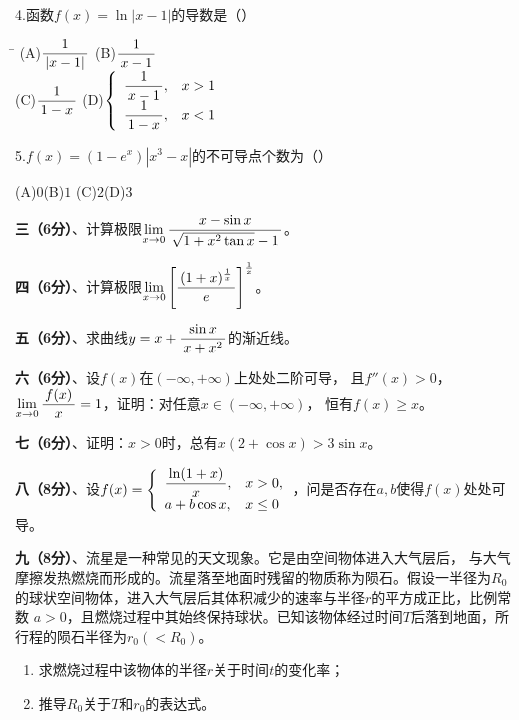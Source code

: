 4.\;函数$f(x)=\ln|x-1|$的导数是（\quad）%
\begin{tabbing}
	\hspace{8cm}\=\kill
	\quad\quad\quad(A)\;$\displaystyle\frac{\,{1}\,}{\,{|x-1|}\,}$ \> 
	(B)\;$\displaystyle\frac{\,{1}\,}{\,{x-1}\,}$ \\ 
	\quad\quad\quad(C)\;$\displaystyle\frac{\,{1}\,}{\,{1-x}\,}$\>
	(D)\;$\left\{\begin{array}{ll}
	\displaystyle\frac{\,{1}\,}{\,{x-1}\,},&x>1\\ \displaystyle\frac{\,{1}\,}{\,{1-x}\,},&x<1
	\end{array}\right.$
\end{tabbing}

5.\;$f(x)=(1-e^x)|x^3-x|$的不可导点个数为（\quad）%

\quad (A)\;$0$\quad\quad\quad(B)\;$1$
\quad\quad\quad (C)\;$2$\quad\quad\quad(D)\;$3$

\bigskip

{\bf 三（6分）}、计算极限$\lim\limits_{x\to{0}}\displaystyle\frac{\,{x-\sin x}\,}{\,{\sqrt{1+x^2\tan x}-1}\,}$。

\bs

{\bf 四（6分）}、计算极限$\lim\limits_{x\to{0}}\left[\displaystyle\frac{\,{(1+x)^{\frac1x}}\,}{\,{e}\,}\right]^{\frac1x}$。

\bs

{\bf 五（6分）}、求曲线$y=x+\displaystyle\frac{\,{\sin x}\,}{\,{x+x^2}\,}$的渐近线。

\bs

{\bf 六（6分）}、设$f(x)$在$(-\infty,+\infty)$上处处二阶可导，
且$f''(x)>0$，$\lim\limits_{x\to{0}}\displaystyle\frac{\,{f(x)}\,}{\,{x}\,}=1$，证明：对任意$x\in(-\infty,+\infty)$，
恒有$f(x)\geq x$。

\bs

{\bf 七（6分）}、证明：$x>0$时，总有$x(2+\cos x)>3\sin x$。

\bs

{\bf 八（8分）}、设$f(x)=\left\{\begin{array}{ll}
	\displaystyle\frac{\,{\ln(1+x)}\,}{\,{x}\,}, & x>0,\\ a+b\cos x, & x\leq 0
\end{array}\right.$，问是否存在$a,b$使得$f(x)$处处可导。

\bs

{\bf 九（8分）}、流星是一种常见的天文现象。它是由空间物体进入大气层后，
与大气摩擦发热燃烧而形成的。流星落至地面时残留的物质称为陨石。假设一半径为$R_0$
的球状空间物体，进入大气层后其体积减少的速率与半径$r$的平方成正比，比例常数
$a>0$，且燃烧过程中其始终保持球状。已知该物体经过时间$T$后落到地面，所
行程的陨石半径为$r_0(<R_0)$。
\begin{enumerate}[(1)]
  \setlength{\itemindent}{1cm}
  \item 求燃烧过程中该物体的半径$r$关于时间$t$的变化率；
  \item 推导$R_0$关于$T$和$r_0$的表达式。
\end{enumerate}

